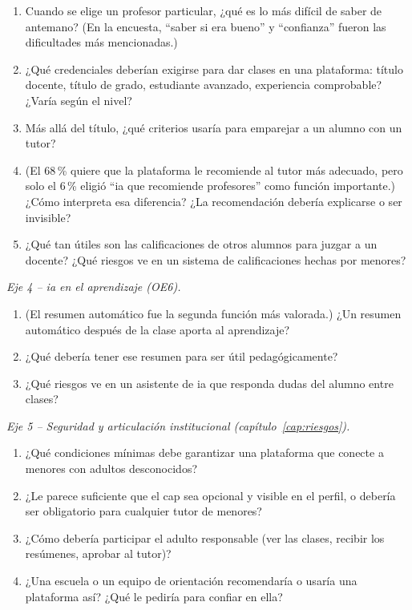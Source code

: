 \begin{enumerate}[resume]
    \item Cuando se elige un profesor particular, ¿qué es lo más difícil de
          saber de antemano? (En la encuesta, ``saber si era bueno'' y
          ``confianza'' fueron las dificultades más mencionadas.)
    \item ¿Qué credenciales deberían exigirse para dar clases en una
          plataforma: título docente, título de grado, estudiante
          avanzado, experiencia comprobable? ¿Varía según el nivel?
    \item Más allá del título, ¿qué criterios usaría para emparejar a un
          alumno con un tutor?
    \item (El 68\,\% quiere que la plataforma le recomiende al tutor más
          adecuado, pero solo el 6\,\% eligió ``\gls{ia} que recomiende
          profesores'' como función importante.) ¿Cómo interpreta esa
          diferencia? ¿La recomendación debería explicarse o ser
          invisible?
    \item ¿Qué tan útiles son las calificaciones de otros alumnos para
          juzgar a un docente? ¿Qué riesgos ve en un sistema de
          calificaciones hechas por menores?
\end{enumerate}

\emph{Eje 4 -- \gls{ia} en el aprendizaje (OE6).}

\begin{enumerate}[resume]
    \item (El resumen automático fue la segunda función más valorada.)
          ¿Un resumen automático después de la clase aporta al
          aprendizaje?
    \item ¿Qué debería tener ese resumen para ser útil pedagógicamente?
    \item ¿Qué riesgos ve en un asistente de \gls{ia} que responda dudas
          del alumno entre clases?
\end{enumerate}

\emph{Eje 5 -- Seguridad y articulación institucional
(capítulo~\ref{cap:riesgos}).}

\begin{enumerate}[resume]
    \item ¿Qué condiciones mínimas debe garantizar una plataforma que
          conecte a menores con adultos desconocidos?
    \item ¿Le parece suficiente que el \gls{cap} sea opcional y visible en
          el perfil, o debería ser obligatorio para cualquier tutor de
          menores?
    \item ¿Cómo debería participar el adulto responsable (ver las clases,
          recibir los resúmenes, aprobar al tutor)?
    \item ¿Una escuela o un equipo de orientación recomendaría o usaría una
          plataforma así? ¿Qué le pediría para confiar en ella?
\end{enumerate}

